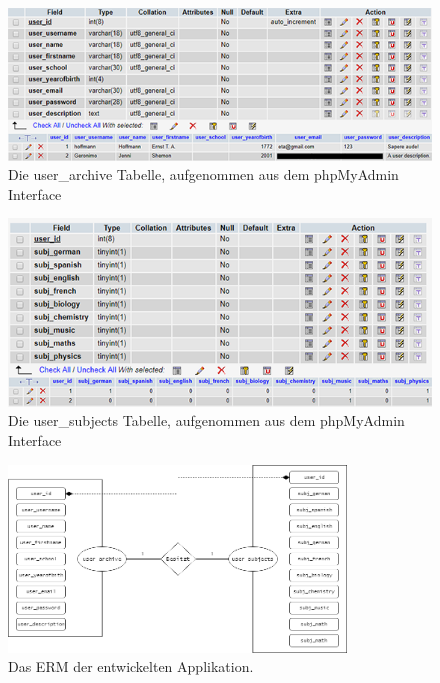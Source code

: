 \documentclass[a4paper,11pt]{report}
\begin{document}
				\begin{figure}
					\begin{center}
						\includegraphics{user_archive.png}
						\caption{Die user\_archive Tabelle, aufgenommen aus dem phpMyAdmin Interface}
						\label{user_archive:PNG}
					\end{center}
				\end{figure}
				\begin{figure}
					\begin{center}
						\includegraphics{user_subjects.png}
						\caption{Die user\_subjects Tabelle, aufgenommen aus dem phpMyAdmin Interface}
						\label{user_subjects:PNG}
					\end{center}
				\end{figure}
				\begin{figure}
					\begin{center}
						\includegraphics[width=0.8\textwidth]{ERM-Matura.png}
						\caption{Das ERM der entwickelten Applikation.}
						\label{ERM}
					\end{center}
				\end{figure}
				
\end{document}

